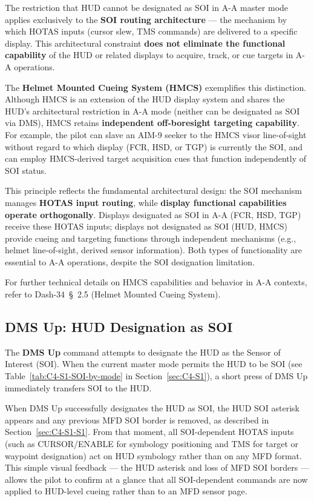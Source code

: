 \documentclass[11pt,a4paper]{article}
\providecommand{\dashref}[1]{Dash-34~\S~#1}
\begin{document}
The restriction that HUD cannot be designated as SOI in A-A master mode applies exclusively to the \textbf{SOI routing architecture} — the mechanism by which HOTAS inputs (cursor slew, TMS commands) are delivered to a specific display. This architectural constraint \textbf{does not eliminate the functional capability} of the HUD or related displays to acquire, track, or cue targets in A-A operations.

The \textbf{Helmet Mounted Cueing System (HMCS)} exemplifies this distinction. Although HMCS is an extension of the HUD display system and shares the HUD's architectural restriction in A-A mode (neither can be designated as SOI via DMS), HMCS retains \textbf{independent off-boresight targeting capability}. For example, the pilot can slave an AIM-9 seeker to the HMCS visor line-of-sight without regard to which display (FCR, HSD, or TGP) is currently the SOI, and can employ HMCS-derived target acquisition cues that function independently of SOI status.

This principle reflects the fundamental architectural design: the SOI mechanism manages \textbf{HOTAS input routing}, while \textbf{display functional capabilities operate orthogonally}. Displays designated as SOI in A-A (FCR, HSD, TGP) receive these HOTAS inputs; displays not designated as SOI (HUD, HMCS) provide cueing and targeting functions through independent mechanisms (e.g., helmet line-of-sight, derived sensor information). Both types of functionality are essential to A-A operations, despite the SOI designation limitation.

For further technical details on HMCS capabilities and behavior in A-A contexts, refer to \dashref{2.5} (Helmet Mounted Cueing System).
\subsection{DMS Up: HUD Designation as SOI}
\label{sec:C4-S2}

The \textbf{DMS Up} command attempts to designate the HUD as the Sensor of Interest (SOI). When the current master mode permits the HUD to be SOI (see Table~\ref{tab:C4-S1-SOI-by-mode} in Section~\ref{sec:C4-S1}), a short press of DMS Up immediately transfers SOI to the HUD.

When DMS Up successfully designates the HUD as SOI, the HUD SOI asterisk appears and any previous MFD SOI border is removed, as described in Section~\ref{sec:C4-S1-S1}. From that moment, all SOI-dependent HOTAS inputs (such as CURSOR/ENABLE for symbology positioning and TMS for target or waypoint designation) act on HUD symbology rather than on any MFD format. This simple visual feedback --- the HUD asterisk and loss of MFD SOI borders --- allows the pilot to confirm at a glance that all SOI-dependent commands are now applied to HUD-level cueing rather than to an MFD sensor page.
\end{document}

